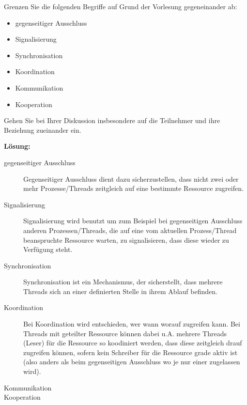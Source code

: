 

\begin{description}

Grenzen Sie die folgenden Begriffe auf Grund der Vorlesung gegeneinander ab: 
    \begin{itemize}
      \item gegenseitiger Ausschluss 
      \item Signalisierung 
      \item Synchronisation 
      \item Koordination 
      \item Kommunikation 
      \item Kooperation 
    \end{itemize}
Gehen Sie bei Ihrer Diskussion insbesondere auf die Teilnehmer und ihre Beziehung 
zueinander ein. 

\textbf{Lösung:}\\

    \begin{description}
      \item[gegenseitiger Ausschluss]
        Gegenseitiger Ausschluss dient dazu sicherzustellen, dass nicht zwei oder mehr Prozesse/Threads zeitgleich auf eine bestimmte Ressource zugreifen.
      \item[Signalisierung ]
        Signalisierung wird benutzt um zum Beispiel bei gegenseitigen Ausschluss anderen Prozessen/Threads, die auf eine vom aktuellen Prozess/Thread beanspruchte Ressource warten, zu signalisieren, dass diese wieder zu Verfügung steht.
      \item[Synchronisation ]
        Synchronisation ist ein Mechanismus, der sicherstellt, dass mehrere Threads sich an einer definierten Stelle in ihrem Ablauf befinden.
      \item[Koordination ]
        Bei Koordination wird entschieden, wer wann worauf zugreifen kann. Bei Threads mit geteilter Ressource können dabei u.A. mehrere Threads (Leser) für die Ressource so koodiniert werden, dass diese zeitgleich drauf zugreifen können, sofern kein Schreiber für die Ressource grade aktiv ist (also anders als beim gegenseitigen Ausschluss wo je nur einer zugelassen wird).
      \item[Kommunikation ]
      \item[Kooperation ]
    \end{description}


\end{description}
